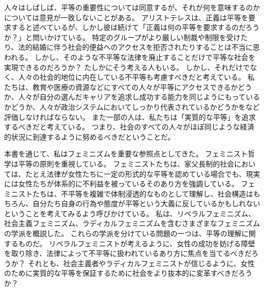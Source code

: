 \documentclass[paper=a4,book,openany]{jlreq}
\begin{document}
人々はしばしば、平等の重要性については同意するが、それが何を意味するのかについては意見が一致しないことがある。
アリストテレスは、正義は平等を要求すると述べているが、しかし彼は続けて「正義は何の平等を要求するのだろうか？」と問いかけている。
特定のグループがより厳しい制裁や制限を受けたり、法的結婚に伴う社会的便益へのアクセスを拒否されたりすることは不当に思われる。
しかし、そのような不平等な法律を廃止することだけで平等な社会を実現できるのだろうか？ たしかにそう考える人もいる。
しかし、それだけでなく、人々の社会的地位に内在している不平等も考慮すべきだと考えている。
私たちは、教育や医療の資源などにすべての人々が平等にアクセスできるかどうか、人々が自分の選んだキャリアを追求し成功する能力を同じようにもっているかどうか、人々が政治システムにおいてしっかり代表されているかどうかをなど評価しなければならない。
また一部の人は、私たちは「実質的な平等」を追求するべきだと考えている。
つまり、社会のすべての人々がほぼ同じような経済的状況に到達するように努めるべきだということだ。

本書を通じて、私はフェミニズムを重要な参照点としてきた。
フェミニスト哲学は平等の原則を重視している。
フェミニストたちは、家父長制的社会においては、たとえ法律が女性たちに一定の形式的な平等を認めている場合でも、現実には女性たちが体系的に不利益を被っているそのあり方を強調している。
フェミニストたちは、不平等を複雑で体制浸透的なものとして理解し、社会構造はもちろん、自分たち自身の行為や態度が平等という大義に反しているかもしれないということを考えてみるよう呼びかけている。
私は、リベラルフェミニズム、社会主義フェミニズム、ラディカルフェミニズムを含むさまざまなフェミニズムの学派を概説した。
これらの学派を分けている問題の一つは、平等の理解に関するものだ。
リベラルフェミニストが考えるように、女性の成功を妨げる障壁を取り除き、法律によって不平等に扱われているあり方に焦点を当てるべきだろうか？ それとも、社会主義者やラディカルフェミニストが信じるように、女性のために実質的な平等を保証するために社会をより抜本的に変革すべきだろうか？
\end{document}
